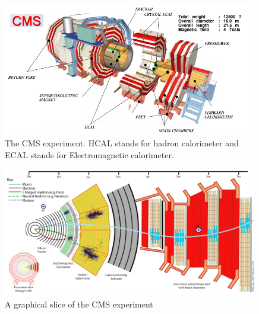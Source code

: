 \begin{figure}[htb]
\centering
\includegraphics[width=0.99\textwidth]{Experiment/CMScollaborationPoster.png}
\caption{The CMS experiment.  HCAL stands for hadron calorimeter and ECAL stands for Electromagnetic calorimeter.}
\label{fig:CMScolaborationPoster}
\end{figure}

\begin{figure}[htb]
\centering
\includegraphics[width=0.99\textwidth]{Experiment/CMS_Slice.png}
\caption{A graphical slice of the CMS experiment}
\label{fig:CMS_Slice}
\end{figure}


